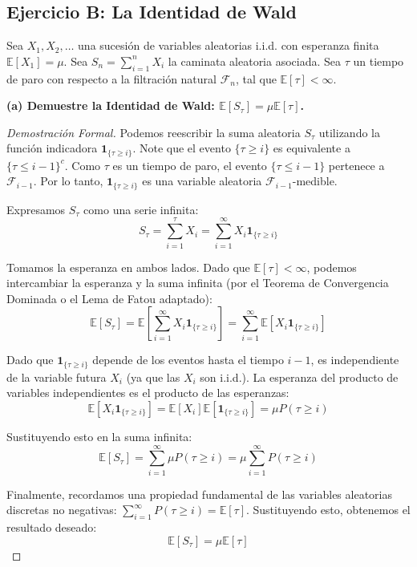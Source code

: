 \documentclass[12pt, a4paper]{article}
\begin{document}
\vspace{0.5cm}

\subsection{Ejercicio B: La Identidad de Wald}
Sea $X_1, X_2, \dots$ una sucesión de variables aleatorias i.i.d. con esperanza finita $\mathbb{E}[X_1] = \mu$. Sea $S_n = \sum_{i=1}^n X_i$ la caminata aleatoria asociada. Sea $\tau$ un tiempo de paro con respecto a la filtración natural $\mathcal{F}_n$, tal que $\mathbb{E}[\tau] < \infty$.

\vspace{0.3cm}
\noindent \textbf{(a) Demuestre la Identidad de Wald: $\mathbb{E}[S_\tau] = \mu \mathbb{E}[\tau]$.}

\begin{proof}[Demostración Formal]
Podemos reescribir la suma aleatoria $S_\tau$ utilizando la función indicadora $\mathbf{1}_{\{\tau \ge i\}}$. Note que el evento $\{\tau \ge i\}$ es equivalente a $\{\tau \le i - 1\}^c$. Como $\tau$ es un tiempo de paro, el evento $\{\tau \le i - 1\}$ pertenece a $\mathcal{F}_{i-1}$. Por lo tanto, $\mathbf{1}_{\{\tau \ge i\}}$ es una variable aleatoria $\mathcal{F}_{i-1}$-medible.

Expresamos $S_\tau$ como una serie infinita:
$$ S_\tau = \sum_{i=1}^\tau X_i = \sum_{i=1}^\infty X_i \mathbf{1}_{\{\tau \ge i\}} $$

Tomamos la esperanza en ambos lados. Dado que $\mathbb{E}[\tau] < \infty$, podemos intercambiar la esperanza y la suma infinita (por el Teorema de Convergencia Dominada o el Lema de Fatou adaptado):
$$ \mathbb{E}[S_\tau] = \mathbb{E}\left[ \sum_{i=1}^\infty X_i \mathbf{1}_{\{\tau \ge i\}} \right] = \sum_{i=1}^\infty \mathbb{E}[ X_i \mathbf{1}_{\{\tau \ge i\}} ] $$

Dado que $\mathbf{1}_{\{\tau \ge i\}}$ depende de los eventos hasta el tiempo $i-1$, es independiente de la variable futura $X_i$ (ya que las $X_i$ son i.i.d.). La esperanza del producto de variables independientes es el producto de las esperanzas:
$$ \mathbb{E}[ X_i \mathbf{1}_{\{\tau \ge i\}} ] = \mathbb{E}[X_i] \mathbb{E}[\mathbf{1}_{\{\tau \ge i\}}] = \mu P(\tau \ge i) $$

Sustituyendo esto en la suma infinita:
$$ \mathbb{E}[S_\tau] = \sum_{i=1}^\infty \mu P(\tau \ge i) = \mu \sum_{i=1}^\infty P(\tau \ge i) $$

Finalmente, recordamos una propiedad fundamental de las variables aleatorias discretas no negativas: $\sum_{i=1}^\infty P(\tau \ge i) = \mathbb{E}[\tau]$. Sustituyendo esto, obtenemos el resultado deseado:
$$ \mathbb{E}[S_\tau] = \mu \mathbb{E}[\tau] $$
\end{proof}
\end{document}
